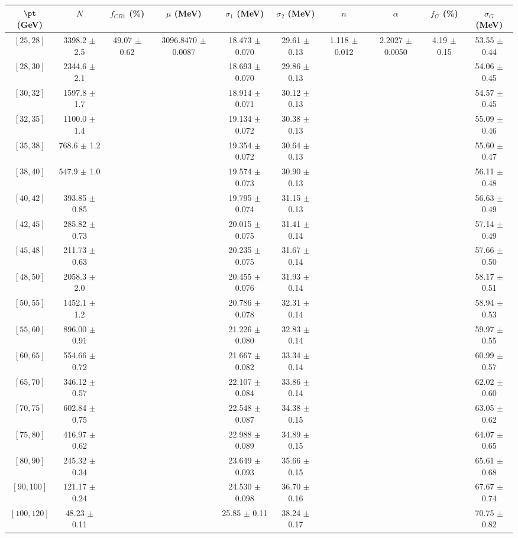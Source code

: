 \begin{tabular}{c||c|c|c|c|c|c|c|c|c}
$\pt$ (GeV) & $N$ & $f_{CB1}$ (\%)  & $\mu$ (MeV) & $\sigma_1$ (MeV) & $\sigma_2$ (MeV) & $n$ & $\alpha$ & $f_G$ (\%) & $\sigma_G$ (MeV) \\
\hline
$[25, 28]$ & 3398.2 $\pm$ 2.5 & \multirow{19}{*}{49.07 $\pm$ 0.62} & \multirow{19}{*}{3096.8470 $\pm$ 0.0087} & 18.473 $\pm$ 0.070 & 29.61 $\pm$ 0.13 & \multirow{19}{*}{1.118 $\pm$ 0.012} & \multirow{19}{*}{2.2027 $\pm$ 0.0050} & \multirow{19}{*}{4.19 $\pm$ 0.15} & 53.55 $\pm$ 0.44\\
$[28, 30]$ & 2344.6 $\pm$ 2.1 &  &  & 18.693 $\pm$ 0.070 & 29.86 $\pm$ 0.13 &  &  &  & 54.06 $\pm$ 0.45\\
$[30, 32]$ & 1597.8 $\pm$ 1.7 &  &  & 18.914 $\pm$ 0.071 & 30.12 $\pm$ 0.13 &  &  &  & 54.57 $\pm$ 0.45\\
$[32, 35]$ & 1100.0 $\pm$ 1.4 &  &  & 19.134 $\pm$ 0.072 & 30.38 $\pm$ 0.13 &  &  &  & 55.09 $\pm$ 0.46\\
$[35, 38]$ & 768.6 $\pm$ 1.2 &  &  & 19.354 $\pm$ 0.072 & 30.64 $\pm$ 0.13 &  &  &  & 55.60 $\pm$ 0.47\\
$[38, 40]$ & 547.9 $\pm$ 1.0 &  &  & 19.574 $\pm$ 0.073 & 30.90 $\pm$ 0.13 &  &  &  & 56.11 $\pm$ 0.48\\
$[40, 42]$ & 393.85 $\pm$ 0.85 &  &  & 19.795 $\pm$ 0.074 & 31.15 $\pm$ 0.13 &  &  &  & 56.63 $\pm$ 0.49\\
$[42, 45]$ & 285.82 $\pm$ 0.73 &  &  & 20.015 $\pm$ 0.075 & 31.41 $\pm$ 0.14 &  &  &  & 57.14 $\pm$ 0.49\\
$[45, 48]$ & 211.73 $\pm$ 0.63 &  &  & 20.235 $\pm$ 0.075 & 31.67 $\pm$ 0.14 &  &  &  & 57.66 $\pm$ 0.50\\
$[48, 50]$ & 2058.3 $\pm$ 2.0 &  &  & 20.455 $\pm$ 0.076 & 31.93 $\pm$ 0.14 &  &  &  & 58.17 $\pm$ 0.51\\
$[50, 55]$ & 1452.1 $\pm$ 1.2 &  &  & 20.786 $\pm$ 0.078 & 32.31 $\pm$ 0.14 &  &  &  & 58.94 $\pm$ 0.53\\
$[55, 60]$ & 896.00 $\pm$ 0.91 &  &  & 21.226 $\pm$ 0.080 & 32.83 $\pm$ 0.14 &  &  &  & 59.97 $\pm$ 0.55\\
$[60, 65]$ & 554.66 $\pm$ 0.72 &  &  & 21.667 $\pm$ 0.082 & 33.34 $\pm$ 0.14 &  &  &  & 60.99 $\pm$ 0.57\\
$[65, 70]$ & 346.12 $\pm$ 0.57 &  &  & 22.107 $\pm$ 0.084 & 33.86 $\pm$ 0.14 &  &  &  & 62.02 $\pm$ 0.60\\
$[70, 75]$ & 602.84 $\pm$ 0.75 &  &  & 22.548 $\pm$ 0.087 & 34.38 $\pm$ 0.15 &  &  &  & 63.05 $\pm$ 0.62\\
$[75, 80]$ & 416.97 $\pm$ 0.62 &  &  & 22.988 $\pm$ 0.089 & 34.89 $\pm$ 0.15 &  &  &  & 64.07 $\pm$ 0.65\\
$[80, 90]$ & 245.32 $\pm$ 0.34 &  &  & 23.649 $\pm$ 0.093 & 35.66 $\pm$ 0.15 &  &  &  & 65.61 $\pm$ 0.68\\
$[90, 100]$ & 121.17 $\pm$ 0.24 &  &  & 24.530 $\pm$ 0.098 & 36.70 $\pm$ 0.16 &  &  &  & 67.67 $\pm$ 0.74\\
$[100, 120]$ & 48.23 $\pm$ 0.11 &  &  & 25.85 $\pm$ 0.11 & 38.24 $\pm$ 0.17 &  &  &  & 70.75 $\pm$ 0.82\\
\end{tabular}
